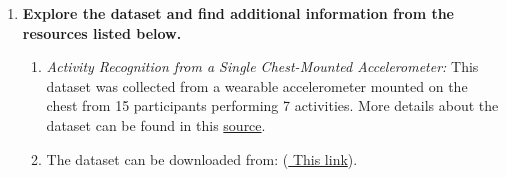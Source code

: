 \documentclass[12pt]{article}
\begin{document}
\begin{enumerate}

\item \textbf{Explore the dataset and find additional information from the resources listed below.}
\begin{enumerate}
\item \textit{Activity Recognition from a Single  Chest-Mounted Accelerometer:} This dataset was  collected from a wearable accelerometer mounted on the chest from 15 participants performing 7 activities. More details about the dataset can be found in this \href{paper:https://link.springer.com/chapter/10.1007/978-3 -642-21257-4_36}{ source}.
\item The dataset can be downloaded from: (\href{https://archive.ics.uci.edu/ml/datasets/Activity+Recognition+from+Single+Chest-Mounted+Accelerometer2}{ This link}).

\end{enumerate}



\newpage

\newpage

\newpage

%









\end{enumerate}




%




\end{document}
